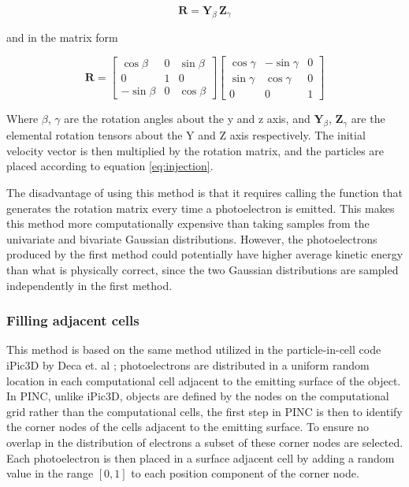 \begin{equation}\label{eq:rotMat}
    \pmb{R} = \pmb{Y}_{\beta} \, \pmb{Z}_{\gamma}
\end{equation}


and in the matrix form


\begin{equation}
    \pmb{R} = 
        \begin{bmatrix}
            \cos \beta & 0 & \sin \beta \\
            0 & 1 & 0 \\
            -\sin \beta & 0 & \cos \beta
        \end{bmatrix}
        \begin{bmatrix}
            \cos \gamma & -\sin \gamma & 0 \\
            \sin \gamma & \cos \gamma & 0 \\
            0 & 0 & 1
        \end{bmatrix}
\end{equation}

Where $\beta$, $\gamma$ are the rotation angles about the y and z axis, and $\pmb{Y}_{\beta}$, $\pmb{Z}_{\gamma}$ are the elemental rotation tensors about the Y and Z axis respectively. The initial velocity vector is then multiplied by the rotation matrix, and the particles are placed according to equation \ref{eq:injection}.

The disadvantage of using this method is that it requires calling the function that generates the rotation matrix every time a photoelectron is emitted. This makes this method more computationally expensive than taking samples from the univariate and bivariate Gaussian distributions. However, the photoelectrons produced by the first method could potentially have higher average kinetic energy than what is physically correct, since the two Gaussian distributions are sampled independently in the first method.



\subsubsection*{Filling adjacent cells}
This method is based on the same method utilized in the particle-in-cell code iPic3D by Deca et. al ; photoelectrons are distributed in a uniform random location in each computational cell adjacent to the emitting surface of the object. In PINC, unlike iPic3D, objects are defined by the nodes on the computational grid rather than the computational cells, the first step in PINC is then to identify the corner nodes of the cells adjacent to the emitting surface. To ensure no overlap in the distribution of electrons a subset of these corner nodes are selected. Each photoelectron is then placed in a surface adjacent cell by adding a random value in the range $[0,1]$ to each position component of the corner node. 

